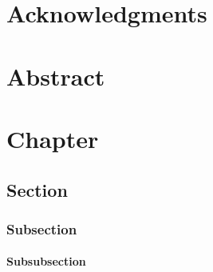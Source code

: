 \documentclass[english,counters by chapter]{uniud}
\begin{document}

\frontmatter

\maketitle
 
% 

\chapter*{Acknowledgments}

\blindtext

\chapter*{Abstract}

\blindtext

\cleardoublepage

\tableofcontents*


\mainmatter

\chapter{Chapter}
\blindmathtrue

\blindtext

\section{Section}

\blindtext

\subsection{Subsection}

\blindtext

\subsubsection{Subsubsection}
\end{document}
